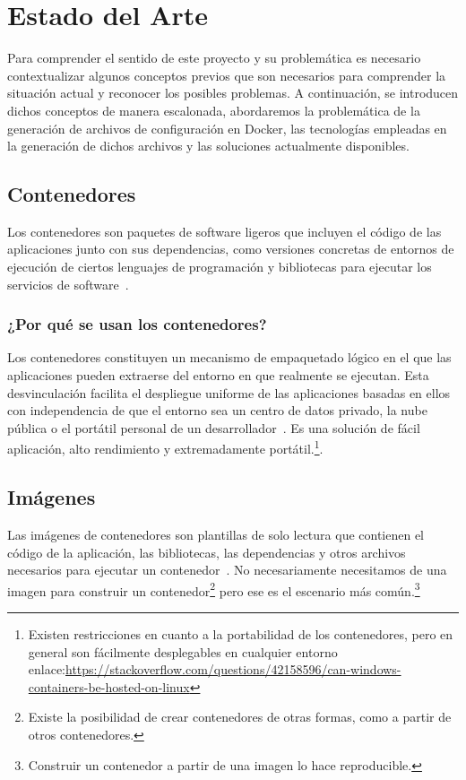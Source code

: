 \documentclass[12pt, a4paper, twoside]{article}
\begin{document}
\section{Estado del Arte}
\label{sec:Estado del Arte}
Para comprender el sentido de este proyecto y su problemática es necesario contextualizar algunos conceptos previos que son necesarios para comprender la situación actual y reconocer los posibles problemas.
A continuación, se introducen dichos conceptos de manera escalonada, abordaremos la problemática de la generación de archivos de configuración en Docker, las tecnologías empleadas en la generación de dichos archivos y las soluciones actualmente disponibles.

\subsection{Contenedores}
Los contenedores son paquetes de software ligeros que incluyen el código de las aplicaciones junto con sus dependencias, como versiones concretas de entornos de ejecución de ciertos lenguajes de programación y bibliotecas para ejecutar los servicios de software~\cite{googlecontainers}.
\subsubsection{¿Por qué se usan los contenedores?}
Los contenedores constituyen un mecanismo de empaquetado lógico en el que las aplicaciones pueden extraerse del entorno en que realmente se ejecutan. 
Esta desvinculación facilita el despliegue uniforme de las aplicaciones basadas en ellos con independencia de que el entorno sea un centro de datos privado, la nube pública o el portátil personal de un desarrollador~\cite{googlecontainers}.
Es una solución de fácil aplicación, alto rendimiento y extremadamente portátil.\footnote{Existen restricciones en cuanto a la portabilidad de los contenedores, pero en general son fácilmente desplegables en cualquier entorno enlace:\href{https://stackoverflow.com/questions/42158596/can-windows-containers-be-hosted-on-linux}{https://stackoverflow.com/questions/42158596/can-windows-containers-be-hosted-on-linux}}.
\newpage

\subsection{Imágenes}
Las imágenes de contenedores son plantillas de solo lectura que contienen el código de la aplicación, las bibliotecas, las dependencias y otros archivos necesarios para ejecutar un contenedor~\cite{awsdocker}. 
No necesariamente necesitamos de una imagen para construir un contenedor\footnote{Existe la posibilidad de crear contenedores de otras formas, como a partir de otros contenedores.} pero ese es el escenario más común.\footnote{Construir un contenedor a partir de una imagen lo hace reproducible.}
\end{document}
